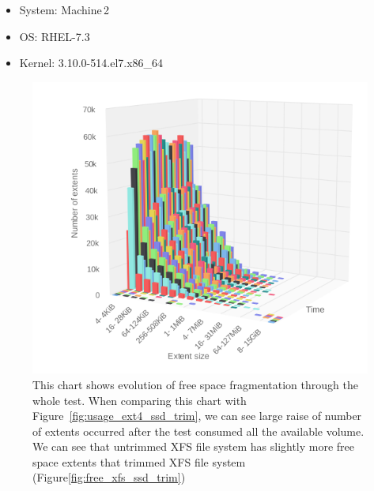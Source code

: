 \documentclass[
  color, %
  table, %
  lof,   %
  lot,   %
]{fithesis3}
\begin{document}
\begin{itemize}
\itemsep0em 
   \item System: Machine\,2
   \item OS: RHEL-7.3
   \item Kernel: 3.10.0-514.el7.x86\_64
\end{itemize}

\begin{figure}[h]
    \centering
    \includegraphics[width=\textwidth,keepaspectratio]{../charts/SSD_xfs_notrim/free.png}
    \caption[Evolution of free space fragmentation of XFS during testing on SSD without regular trimming]{This chart shows evolution of free space fragmentation through the whole test. When comparing this chart with Figure~\ref{fig:usage_ext4_ssd_trim}, we can see large raise of number of extents occurred after the test consumed all the available volume. We can see that untrimmed XFS file system has slightly more free space extents that trimmed XFS file system (Figure\ref{fig:free_xfs_ssd_trim})}
    \label{fig:free_xfs_ssd_notrim}
\end{figure}
\end{document}
